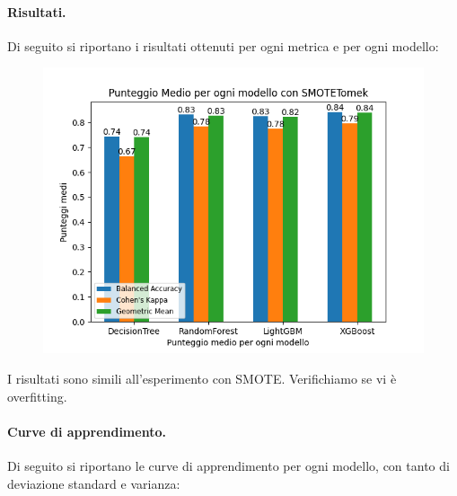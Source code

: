 \paragraph{Risultati.} Di seguito si riportano i risultati ottenuti per ogni metrica e per ogni modello:
\begin{figure}[H]
    \centering
    \includegraphics[scale=0.5]{img/tomek_metrics.png}
\end{figure}

\noindent I risultati sono simili all'esperimento con SMOTE. Verifichiamo se vi è overfitting.

\paragraph{Curve di apprendimento.} Di seguito si riportano le curve di apprendimento per ogni modello, con tanto di deviazione standard e varianza:


